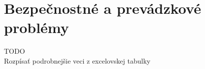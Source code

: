 \chapter{Bezpečnostné a prevádzkové problémy}
{}
TODO\\
Rozpísať podrobnejšie veci z excelovskej tabulky